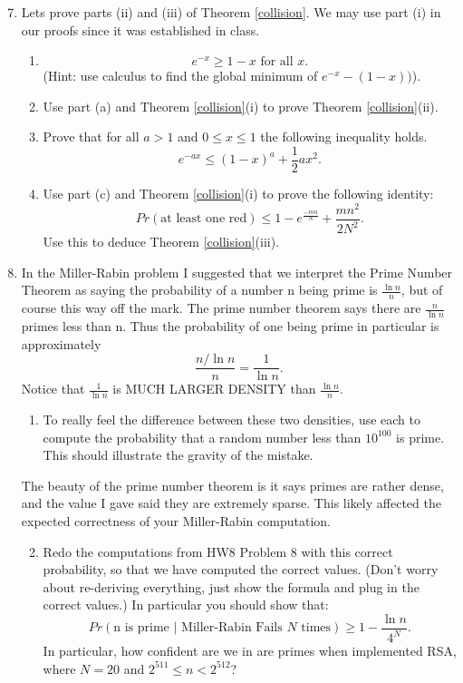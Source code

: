 \documentclass[11pt]{article}
\begin{document}
\begin{enumerate}
  \setcounter{enumi}{6}
  \newpage
  \item{
  Lets prove parts (ii) and (iii) of Theorem \ref{collision}.  We may use part (i) in our proofs since it was established in class.
  \begin{enumerate}
    \item{
    \[e^{-x} \ge 1-x\text{ for all }x.\]
    (Hint: use calculus to find the global minimum of $e^{-x} - (1-x))$).
    }
    \item{
    Use part (a) and Theorem \ref{collision}(i) to prove Theorem \ref{collision}(ii).
    }
    \item{
    Prove that for all $a>1$ and $0\le x\le 1$ the following inequality holds.
    \[e^{-ax}\le (1-x)^a +\frac{1}{2}ax^2.\]
    }
    \item{
    Use part (c) and Theorem \ref{collision}(i) to prove the following identity:
    \[Pr(\text{at least one red})\le 1-e^{\frac{-mn}{N}} + \frac{mn^2}{2N^2}.\]
    Use this to deduce Theorem \ref{collision}(iii).
    }
  \end{enumerate}
  }
  \item{
  In the Miller-Rabin problem I suggested that we interpret the Prime Number Theorem as saying the probability of a number n being prime is $\frac{\ln n}{n}$, but of course this way off the mark.   The prime number theorem says there are $\frac{n}{\ln n}$ primes less than n.  Thus the probability of one being prime in particular is approximately
  \[\frac{n/\ln n}{n} = \frac{1}{\ln n}.\]
  Notice that $\frac{1}{\ln n}$ is MUCH LARGER DENSITY than $\frac{\ln n}{n}$.
  \begin{enumerate}
    \item{
    To really feel the difference between these two densities, use each to compute the probability that a random number less than $10^{100}$ is prime.  This should illustrate the gravity of the mistake.}
  \end{enumerate}
  The beauty of the prime number theorem is it says primes are rather dense, and the value I gave said they are extremely sparse.  This likely affected the expected correctness of your Miller-Rabin computation.
  \begin{enumerate}
    \setcounter{enumii}{1}
    \item{
    Redo the computations from HW8 Problem 8 with this correct probability, so that we have computed the correct values.  (Don't worry about re-deriving everything, just show the formula and plug in the correct values.)  In particular you should show that:
    \[Pr\left(\text{n is prime }|\text{ Miller-Rabin Fails }N\text{ times}\right)\ge 1-\frac{\ln n}{4^N}.\]
    In particular, how confident are we in are primes when implemented RSA, where $N=20$ and $2^{511}\le n< 2^{512}$?
    }
  \end{enumerate}
  }
\end{enumerate}
\end{document}
